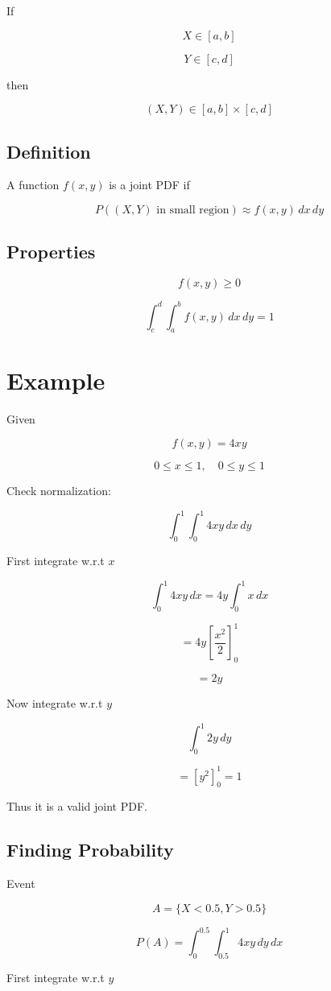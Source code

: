 \documentclass{article}
\begin{document}
If

\[
X \in [a,b]
\]

\[
Y \in [c,d]
\]

then

\[
(X,Y) \in [a,b] \times [c,d]
\]

\subsection{Definition}

A function $f(x,y)$ is a joint PDF if

\[
P((X,Y) \text{ in small region}) \approx f(x,y)\,dx\,dy
\]

\subsection{Properties}

\[
f(x,y) \ge 0
\]

\[
\int_c^d \int_a^b f(x,y)\,dx\,dy = 1
\]

\section{Example}

Given

\[
f(x,y) = 4xy
\]

\[
0 \le x \le 1, \quad 0 \le y \le 1
\]

Check normalization:

\[
\int_0^1 \int_0^1 4xy\,dx\,dy
\]

First integrate w.r.t $x$

\[
\int_0^1 4xy\,dx = 4y \int_0^1 x\,dx
\]

\[
=4y\left[\frac{x^2}{2}\right]_0^1
\]

\[
=2y
\]

Now integrate w.r.t $y$

\[
\int_0^1 2y\,dy
\]

\[
=[y^2]_0^1 = 1
\]

Thus it is a valid joint PDF.

\subsection{Finding Probability}

Event

\[
A = \{X<0.5, Y>0.5\}
\]

\[
P(A) = \int_0^{0.5} \int_{0.5}^{1} 4xy\,dy\,dx
\]

First integrate w.r.t $y$
\end{document}
